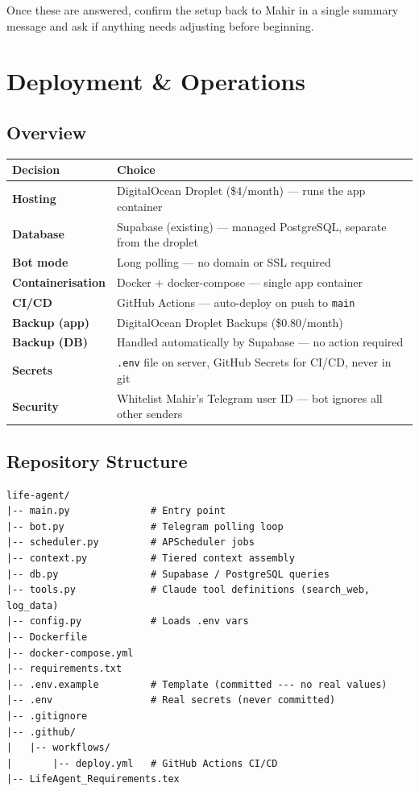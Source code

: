 \documentclass[12pt, a4paper]{article}
\begin{document}
Once these are answered, confirm the setup back to Mahir in a single summary message and ask if anything needs adjusting before beginning.

\section{Deployment \& Operations}

\subsection{Overview}

\begin{longtable}{>{\bfseries}p{4cm} p{10cm}}
\toprule
Decision & Choice \\
\midrule
Hosting & DigitalOcean Droplet (\$4/month) --- runs the app container \\
Database & Supabase (existing) --- managed PostgreSQL, separate from the droplet \\
Bot mode & Long polling --- no domain or SSL required \\
Containerisation & Docker + docker-compose --- single app container \\
CI/CD & GitHub Actions --- auto-deploy on push to \texttt{main} \\
Backup (app) & DigitalOcean Droplet Backups (\$0.80/month) \\
Backup (DB) & Handled automatically by Supabase --- no action required \\
Secrets & \texttt{.env} file on server, GitHub Secrets for CI/CD, never in git \\
Security & Whitelist Mahir's Telegram user ID --- bot ignores all other senders \\
\bottomrule
\end{longtable}

\subsection{Repository Structure}

\begin{lstlisting}
life-agent/
|-- main.py              # Entry point
|-- bot.py               # Telegram polling loop
|-- scheduler.py         # APScheduler jobs
|-- context.py           # Tiered context assembly
|-- db.py                # Supabase / PostgreSQL queries
|-- tools.py             # Claude tool definitions (search_web, log_data)
|-- config.py            # Loads .env vars
|-- Dockerfile
|-- docker-compose.yml
|-- requirements.txt
|-- .env.example         # Template (committed --- no real values)
|-- .env                 # Real secrets (never committed)
|-- .gitignore
|-- .github/
|   |-- workflows/
|       |-- deploy.yml   # GitHub Actions CI/CD
|-- LifeAgent_Requirements.tex
\end{lstlisting}
\end{document}
